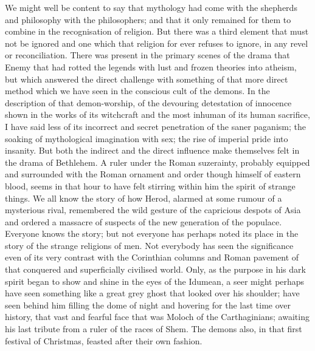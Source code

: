 We might well be content to say that mythology had come with the shepherds and philosophy with the philosophers; and that it only remained for them to combine in the recognisation of religion. But there was a third element that must not be ignored and one which that religion for ever refuses to ignore, in any revel or reconciliation. There was present in the primary scenes of the drama that Enemy that had rotted the legends with lust and frozen theories into atheism, but which answered the direct challenge with something of that more direct method which we have seen in the conscious cult of the demons. In the description of that demon-worship, of the devouring detestation of innocence shown in the works of its witchcraft and the most inhuman of its human sacrifice, I have said less of its incorrect and secret penetration of the saner paganism; the soaking of mythological imagination with sex; the rise of imperial pride into insanity. But both the indirect and the direct influence make themselves felt in the drama of Bethlehem. A ruler under the Roman suzerainty, probably equipped and surrounded with the Roman ornament and order though himself of eastern blood, seems in that hour to have felt stirring within him the spirit of strange things. We all know the story of how Herod, alarmed at some rumour of a mysterious rival, remembered the wild gesture of the capricious despots of Asia and ordered a massacre of suspects of the new generation of the populace. Everyone knows the story; but not everyone has perhaps noted its place in the story of the strange religions of men. Not everybody has seen the significance even of its very contrast with the Corinthian columns and Roman pavement of that conquered and superficially civilised world. Only, as the purpose in his dark spirit began to show and shine in the eyes of the Idumean, a seer might perhaps have seen something like a great grey ghost that looked over his shoulder; have seen behind him filling the dome of night and hovering for the last time over history, that vast and fearful face that was Moloch of the Carthaginians; awaiting his last tribute from a ruler of the races of Shem. The demons also, in that first festival of Christmas, feasted after their own fashion.

